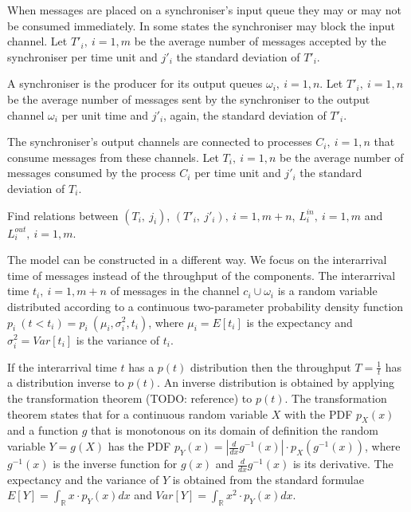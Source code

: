 When messages are placed on a synchroniser's input queue they may or may not be consumed immediately. In some states the synchroniser may block the input channel. Let $T'_{i}, \: i=1,m$ be the average number of messages accepted by the synchroniser per time unit and $j'_{i}$ the standard deviation of $T'_{i}$.

A synchroniser is the producer for its output queues $\omega_{i}, \: i=1,n$. Let $T'_{i}, \: i=1,n$ be the average number of messages sent by the synchroniser to the output channel $\omega_{i}$ per unit time and $j'_{i}$, again, the standard deviation of $T'_{i}$.

The synchroniser's output channels are connected to processes $C_{i}, \: i=1,n$ that consume messages from these channels. Let $T_{i}, \: i=1,n$ be the average number of messages consumed by the process $C_{i}$ per time unit and $j'_{i}$ the standard deviation of $T_{i}$.

\begin{problem}Find relations between $(T_{i}, \: j_{i})$, $(T'_{i}, \: j'_{i}), \: i=1,m+n$, $L^{in}_{i}, \: i=1,m$ and $L^{out}_{i}, \: i=1,m$.
\end{problem}

The model can be constructed in a different way. We focus on the interarrival time of messages instead of the throughput of the components. The interarrival time $t_{i}, \: i=1,m+n$ of messages in the channel $c_{i} \cup \omega_{i}$ is a random variable distributed according to a continuous two-parameter probability density function $p_{i} \: (t < t_{i}) = p_{i} \: (\mu_{i}, \sigma^2_{i}, t_{i})$, where $\mu_{i} = E[t_{i}]$ is the expectancy and $\sigma^2_{i} = Var[t_{i}]$ is the variance of $t_{i}$.


If the interarrival time $t$ has a $p(t)$ distribution then the throughput $T = \frac{1}{t}$ has a distribution inverse to $p(t)$. An inverse distribution is obtained by applying the transformation theorem (TODO: reference) to $p(t)$. The transformation theorem states that for a continuous random variable $X$ with the PDF $p_{X} (x)$ and a function $g$ that is monotonous on its domain of definition the random variable $Y = g(X)$ has the PDF $p_{Y} (x) = |\frac{d}{dx}g^{-1}(x)|\cdot p_{X} (g^{-1}(x))$, where $g^{-1}(x)$ is the inverse function for $g(x)$ and $\frac{d}{dx}g^{-1}(x)$ is its derivative. The expectancy and the variance of $Y$ is obtained from the standard formulae $E[Y] = \int_{\mathbb{R}} x \cdot p_{Y} (x) dx$ and $Var[Y] = \int_{\mathbb{R}} x^2 \cdot p_{Y} (x) dx$.


